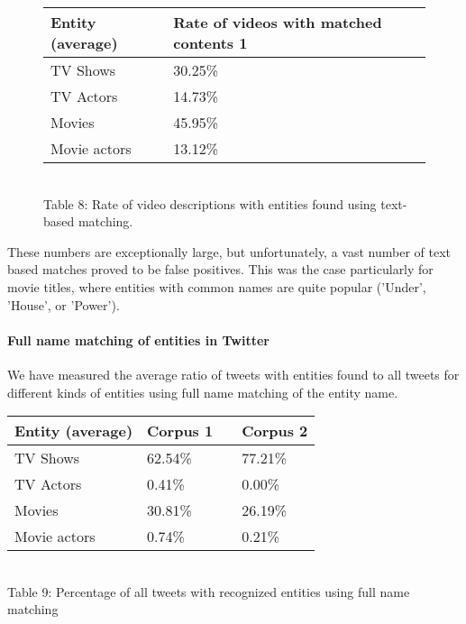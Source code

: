 \begin{figure}[h!]
  \begin{center}
    \begin{tabular}{ | p{4cm} | p{6cm} | } \hline
      Entity (average) & Rate of videos with matched contents 1 \\ \hline
      TV Shows & 30.25\% \\ \hline
      TV Actors & 14.73\% \\ \hline
      Movies & 45.95\% \\ \hline
      Movie actors & 13.12\% \\ \hline
    \end{tabular} \\
    Table 8: Rate of video descriptions with entities found using text-based matching. \\
  \end{center}
\end{figure}

These numbers are exceptionally large, but unfortunately, a vast number of text
based matches proved to be false positives. This was the case particularly for
movie titles, where entities with common names are quite popular (\eg 'Under',
'House', or 'Power').

\paragraph{Full name matching of entities in Twitter}
We have measured the average ratio of tweets with entities found to all tweets for different kinds of entities using full name matching of the entity name.

\begin{center}
  \begin{tabular}{ | p{4cm} | p{2cm} | p{1cm}| p{2cm} | } \hline
    Entity (average) & Corpus 1 & & Corpus 2 \\ \hline
    TV Shows & 62.54\% & & 77.21\% \\ \hline
    TV Actors & 0.41\% & & 0.00\% \\ \hline
    Movies & 30.81\% & & 26.19\% \\ \hline
    Movie actors & 0.74\% & & 0.21\% \\ \hline
  \end{tabular} \\
  Table 9: Percentage of all tweets with recognized entities using full name matching \\
\end{center}

